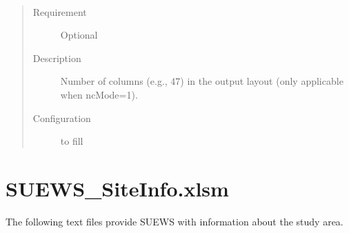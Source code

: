 \documentclass[letterpaper,10pt,english]{sphinxmanual}
\begin{document}

\begin{fulllineitems}
\label{\detokenize{input_files/RunControl/netCDF_related_options:cmdoption-arg-ncol}}~\begin{quote}\begin{description}
\item[{Requirement}] \leavevmode
Optional

\item[{Description}] \leavevmode
Number of columns (e.g., 47) in the output layout (only applicable when ncMode=1).

\item[{Configuration}] \leavevmode
to fill

\end{description}\end{quote}

\end{fulllineitems}



\section{SUEWS\_SiteInfo.xlsm}
\label{\detokenize{input_files/SUEWS_SiteInfo/SUEWS_SiteInfo::doc}}\label{\detokenize{input_files/SUEWS_SiteInfo/SUEWS_SiteInfo:suews-siteinfo-xlsm}}
The following text files provide SUEWS with information about the study
area.
\end{document}
